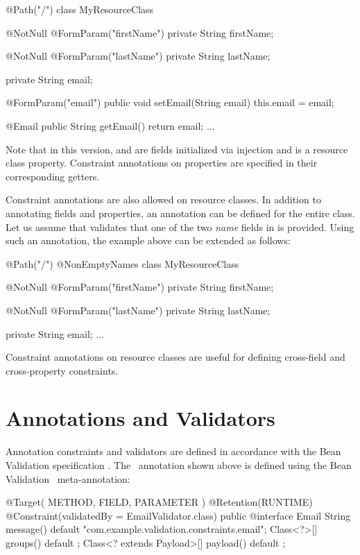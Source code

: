 \begin{listing}{1}
@Path("/")
class MyResourceClass {

  @NotNull @FormParam("firstName")
  private String firstName;

  @NotNull @FormParam("lastName")
  private String lastName;

  private String email;

  @FormParam("email")
  public void setEmail(String email) {
    this.email = email;
  }
  
  @Email
  public String getEmail() {
    return email;
  }
  ...
}
\end{listing}

Note that in this version,  and  are fields initialized via injection and  is a resource class property. Constraint annotations on properties are specified in their corresponding getters.

Constraint annotations are also allowed on resource classes. In addition to annotating fields and properties, an annotation can be defined for the entire class. Let us assume that  validates that one of the two \emph{name} fields in  is provided. Using such an annotation, the example above can be extended as follows:

\begin{listing}{1}
@Path("/")
@NonEmptyNames
class MyResourceClass {

  @NotNull @FormParam("firstName")
  private String firstName;

  @NotNull @FormParam("lastName")
  private String lastName;
  
  private String email;
  ...
}
\end{listing}

Constraint annotations on resource classes are useful for defining cross-field and cross-property constraints. 

\section{Annotations and Validators}
\label{annotations_and_validators}

Annotation constraints and validators are defined in accordance with the Bean Validation specification \cite{bv11}. The \Email\ annotation shown above is defined using the Bean Validation \Constraint\ meta-annotation:

\begin{listing}{1}
@Target( { METHOD, FIELD, PARAMETER })
@Retention(RUNTIME)
@Constraint(validatedBy = EmailValidator.class)
public @interface Email {
  String message() default "{com.example.validation.constraints.email}"; 
  Class<?>[] groups() default {};
  Class<? extends Payload>[] payload() default {};
}
\end{listing}

